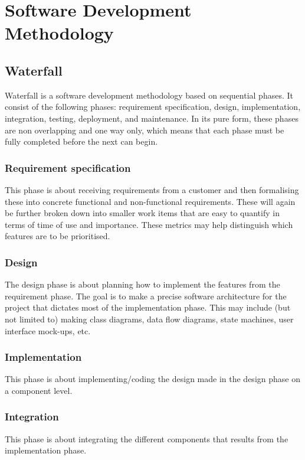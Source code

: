 \section{Software Development Methodology}
\label{sec:pre:method}

\subsection{Waterfall}
\label{sec:pre:waterfall}
Waterfall is a software development methodology based on sequential phases.
It consist of the following phases: requirement specification, design,
implementation, integration, testing, deployment, and maintenance. In its pure
form, these phases are non overlapping and one way only, which means that each
phase must be fully completed before the next can begin.

\subsubsection{Requirement specification}
This phase is about receiving requirements from a customer and then formalising
these into concrete functional and non-functional requirements. These will
again be further broken down into smaller work items that are easy to quantify
in terms of time of use and importance. These metrics may help distinguish
which features are to be prioritised.

\subsubsection{Design}
The design phase is about planning how to implement the features from the
requirement phase. The goal is to make a precise software architecture for the
project that dictates most of the implementation phase. This may include (but
not limited to) making class diagrams, data flow diagrams, state machines, user
interface mock-ups, etc.

\subsubsection{Implementation}
This phase is about implementing/coding the design made in the design phase on
a component level.

\subsubsection{Integration}
This phase is about integrating the different components that results from the
implementation phase.

